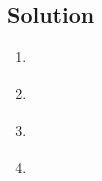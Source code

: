 
\subsection*{Solution}

\begin{enumerate}
\item \lstinline{}

\item \lstinline{}

\item \lstinline{}

\item \lstinline{}

\end{enumerate}
